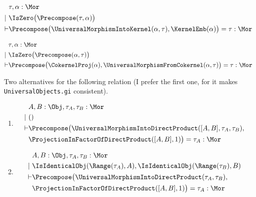 \begin{sequent}
\begin{align*}
  &\tau, \alpha:\Mor\\
  |~ &\IsZero\big( \Precompose( \tau, \alpha ) \big)\\
  \vdash &\Precompose\big(\UniversalMorphismIntoKernel( \alpha , \tau ), \KernelEmb( \alpha ) \big) = \tau:\Mor
\end{align*}
\end{sequent}

\begin{sequent}
\begin{align*}
  &\tau, \alpha:\Mor\\
  |~  &\IsZero\big(\Precompose(\alpha, \tau)\big)\\
  \vdash &\Precompose\big(\CokernelProj( \alpha ), \UniversalMorphismFromCokernel( \alpha, \tau )\big) = \tau:\Mor
\end{align*}
\end{sequent}


Two alternatives for the following relation (I prefer the first one, for it makes
\texttt{UniversalObjects.gi} consistent).
\begin{enumerate}
 \item 
\begin{sequent}
\begin{align*}
  &A, B:\Obj, \tau_A, \tau_B:\Mor\\
  | ~&() \\
  \vdash &\Precompose\big(\UniversalMorphismIntoDirectProduct( [A,B], \tau_A, \tau_B ), \\
  &\ProjectionInFactorOfDirectProduct( [A,B], 1 ) \big) = \tau_A:\Mor
\end{align*}
\end{sequent}
\item
\begin{sequent}
\begin{align*}
  &A, B:\Obj, \tau_A, \tau_B:\Mor\\
  | ~&\IsIdenticalObj( \Range( \tau_A ), A ), \IsIdenticalObj( \Range( \tau_B ), B ) \\
  \vdash &\Precompose\big(\UniversalMorphismIntoDirectProduct( \tau_A, \tau_B ), \\
  &\ProjectionInFactorOfDirectProduct( [A,B], 1 ) \big) = \tau_A:\Mor
\end{align*}
\end{sequent}

\end{enumerate}

